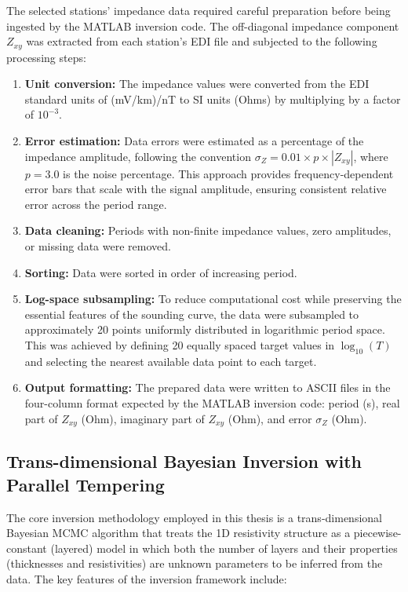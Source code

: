 The selected stations' impedance data required careful preparation before being ingested by the MATLAB inversion code. The off-diagonal impedance component $Z_{xy}$ was extracted from each station's EDI file and subjected to the following processing steps:

\begin{enumerate}
    \item \textbf{Unit conversion:} The impedance values were converted from the EDI standard units of (mV/km)/nT to SI units (Ohms) by multiplying by a factor of $10^{-3}$.

    \item \textbf{Error estimation:} Data errors were estimated as a percentage of the impedance amplitude, following the convention $\sigma_Z = 0.01 \times p \times |Z_{xy}|$, where $p = 3.0$ is the noise percentage. This approach provides frequency-dependent error bars that scale with the signal amplitude, ensuring consistent relative error across the period range.

    \item \textbf{Data cleaning:} Periods with non-finite impedance values, zero amplitudes, or missing data were removed.

    \item \textbf{Sorting:} Data were sorted in order of increasing period.

    \item \textbf{Log-space subsampling:} To reduce computational cost while preserving the essential features of the sounding curve, the data were subsampled to approximately 20 points uniformly distributed in logarithmic period space. This was achieved by defining 20 equally spaced target values in $\log_{10}(T)$ and selecting the nearest available data point to each target.

    \item \textbf{Output formatting:} The prepared data were written to ASCII files in the four-column format expected by the MATLAB inversion code: period (s), real part of $Z_{xy}$ (Ohm), imaginary part of $Z_{xy}$ (Ohm), and error $\sigma_Z$ (Ohm).
\end{enumerate}

\subsection*{Trans-dimensional Bayesian Inversion with Parallel Tempering}

The core inversion methodology employed in this thesis is a trans-dimensional Bayesian MCMC algorithm that treats the 1D resistivity structure as a piecewise-constant (layered) model in which both the number of layers and their properties (thicknesses and resistivities) are unknown parameters to be inferred from the data. The key features of the inversion framework include:

